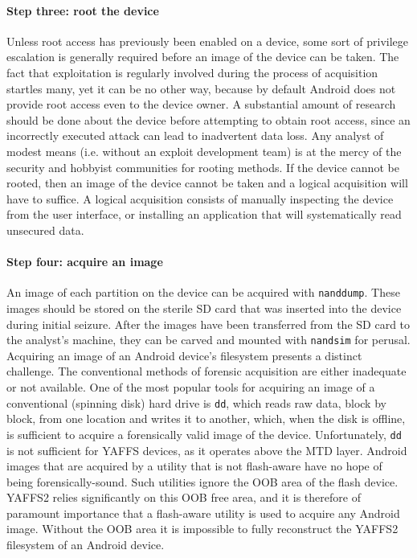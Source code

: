\paragraph{Step three: root the device}
Unless root access has previously been enabled on a device, some sort of privilege escalation is generally required before an image
of the device can be taken. The fact that exploitation is regularly involved during the process of acquisition startles many, yet it
can be no other way, because by default Android does not provide root access even to the device owner.  A substantial amount of
research should be done about the device before attempting to obtain root access, since an incorrectly executed attack can lead to
inadvertent data loss. Any analyst of modest means (i.e. without an exploit development team) is at the mercy of the security and
hobbyist communities for rooting methods. If the device cannot be rooted, then an image of the device cannot be taken and a logical
acquisition will have to suffice. A logical acquisition consists of manually inspecting the device from the user interface, or
installing an application that will systematically read unsecured data.

\paragraph{Step four: acquire an image}
An image of each partition on the device can be acquired with \texttt{nanddump}.  These images should be stored on the sterile SD
card that was inserted into the device during initial seizure.  After the images have been transferred from the SD card to the
analyst's machine, they can be carved and mounted with \texttt{nandsim} for perusal.  Acquiring an image of an Android device's
filesystem presents a distinct challenge.  The conventional methods of forensic acquisition are either inadequate or not available.
One of the most popular tools for acquiring an image of a conventional (spinning disk) hard drive is \texttt{dd}, which reads raw
data, block by block, from one location and writes it to another, which, when the disk is offline, is sufficient to acquire a
forensically valid image of the device.  Unfortunately, \texttt{dd} is not sufficient for YAFFS devices, as it operates above the
MTD layer. Android images that are acquired by a utility that is not flash-aware have no hope of being forensically-sound. Such
utilities ignore the OOB area of the flash device. YAFFS2 relies significantly on this OOB free area, and it is therefore of
paramount importance that a flash-aware utility is used to acquire any Android image.  Without the OOB area it is impossible to
fully reconstruct the YAFFS2 filesystem of an Android device.

